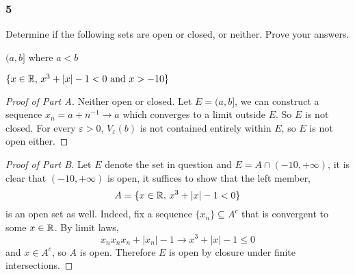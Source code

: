 \documentclass[../main.tex]{subfiles}
\begin{document}
\subsubsection*{5}
\begin{wts}
    Determine if the following sets are open or closed, or neither. Prove your answers.
    \begin{enumroman}
        \item $(a,b]$ where $a<b$
        \item $\{x\in\mathbb{R},\,x^3 + |x|-1<0 \text{ and } x>-10\}$
    \end{enumroman}
\end{wts}

\begin{proof}[Proof of Part A]
    Neither open or closed. Let $E = (a,b]$, we can construct a sequence $x_n = a+n^{-1}\to a$ which converges to a limit outside $E$. So $E$ is not closed. For every $\varepsilon>0$, $V_{\varepsilon}(b)$ is not contained entirely within $E$, so $E$ is not open either.
\end{proof}
\begin{proof}[Proof of Part B]
    Let $E$ denote the set in question and $E=A\cap (-10,+\infty)$, it is clear that $(-10,+\infty)$ is open, it suffices to show that the left member,
    \[A = \{x\in\mathbb{R},\,x^3 + |x|-1<0\}\]
    is an open set as well. Indeed, fix a sequence $\{x_n\}\subseteq A^c$ that is convergent to some $x\in\mathbb{R}$. By limit laws,
    \[x_nx_nx_n + |x_n|-1\to x^3 + |x|-1 \leq 0\]
    and $x\in A^c$, so $A$ is open. Therefore $E$ is open by closure under finite intersections.
\end{proof}
\end{document}
